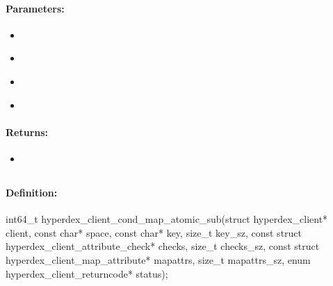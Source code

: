 \paragraph{Parameters:}
\begin{itemize}[noitemsep]
\item {}\\

\item {}\\

\item {}\\

\item {}\\

\end{itemize}

\paragraph{Returns:}
\begin{itemize}[noitemsep]
\item {}\\

\end{itemize}

\pagebreak
\subsection{}
\label{api:c:cond_map_atomic_sub}


\paragraph{Definition:}
\begin{ccode}
int64_t hyperdex_client_cond_map_atomic_sub(struct hyperdex_client* client,
        const char* space,
        const char* key, size_t key_sz,
        const struct hyperdex_client_attribute_check* checks, size_t checks_sz,
        const struct hyperdex_client_map_attribute* mapattrs, size_t mapattrs_sz,
        enum hyperdex_client_returncode* status);
\end{ccode}

